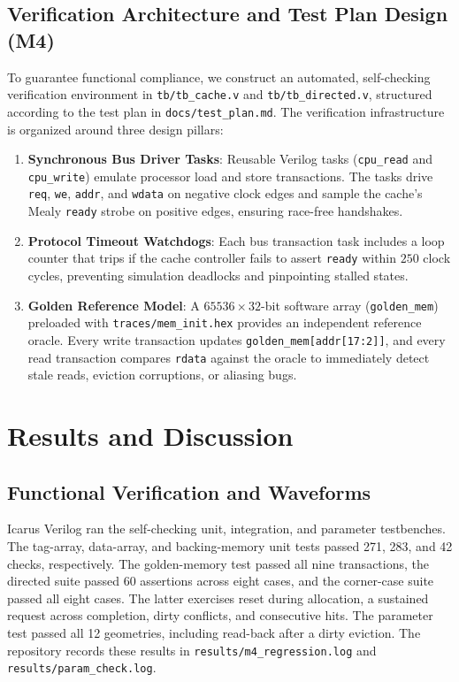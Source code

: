\documentclass[conference]{IEEEtran}
\begin{document}
\subsection{Verification Architecture and Test Plan Design (M4)}
To guarantee functional compliance, we construct an automated, self-checking verification environment in \texttt{tb/tb\_cache.v} and \texttt{tb/tb\_directed.v}, structured according to the test plan in \texttt{docs/test\_plan.md}. The verification infrastructure is organized around three design pillars:
\begin{enumerate}
    \item \textbf{Synchronous Bus Driver Tasks}: Reusable Verilog tasks (\texttt{cpu\_read} and \texttt{cpu\_write}) emulate processor load and store transactions. The tasks drive \texttt{req}, \texttt{we}, \texttt{addr}, and \texttt{wdata} on negative clock edges and sample the cache's Mealy \texttt{ready} strobe on positive edges, ensuring race-free handshakes.
    \item \textbf{Protocol Timeout Watchdogs}: Each bus transaction task includes a loop counter that trips if the cache controller fails to assert \texttt{ready} within $250$ clock cycles, preventing simulation deadlocks and pinpointing stalled states.
    \item \textbf{Golden Reference Model}: A $65536 \times 32$-bit software array (\texttt{golden\_mem}) preloaded with \texttt{traces/mem\_init.hex} provides an independent reference oracle. Every write transaction updates \texttt{golden\_mem[addr[17:2]]}, and every read transaction compares \texttt{rdata} against the oracle to immediately detect stale reads, eviction corruptions, or aliasing bugs.
\end{enumerate}

\section{Results and Discussion}

\subsection{Functional Verification and Waveforms}
Icarus Verilog ran the self-checking unit, integration, and parameter testbenches. The tag-array, data-array, and backing-memory unit tests passed 271, 283, and 42 checks, respectively. The golden-memory test passed all nine transactions, the directed suite passed 60 assertions across eight cases, and the corner-case suite passed all eight cases. The latter exercises reset during allocation, a sustained request across completion, dirty conflicts, and consecutive hits. The parameter test passed all 12 geometries, including read-back after a dirty eviction. The repository records these results in \texttt{results/m4\_regression.log} and \texttt{results/param\_check.log}.
\end{document}
